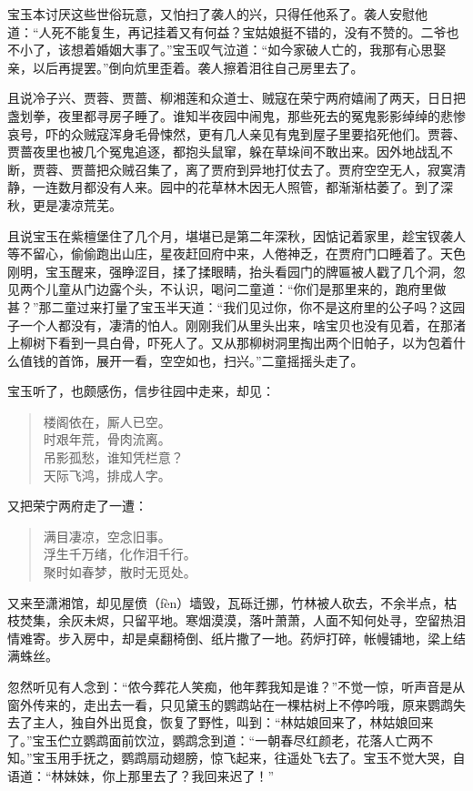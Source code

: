 \documentclass[12pt,oneside]{book}
\newenvironment{shici}{%
\begin{verse}%
\centering\large\hspace{12pt}}%
{\end{verse}}
\begin{document}
宝玉本讨厌这些世俗玩意，又怕扫了袭人的兴，只得任他系了。袭人安慰他道：“人死不能复生，再记挂着又有何益？宝姑娘挺不错的，没有不赞的。二爷也不小了，该想着婚姻大事了。”宝玉叹气泣道：“如今家破人亡的，我那有心思娶亲，以后再提罢。”倒向炕里歪着。袭人擦着泪往自己房里去了。

且说冷子兴、贾蓉、贾蔷、柳湘莲和众道士、贼寇在荣宁两府嬉闹了两天，日日把盏划拳，夜里都寻房子睡了。谁知半夜园中闹鬼，那些死去的冤鬼影影绰绰的悲惨哀号，吓的众贼寇浑身毛骨悚然，更有几人亲见有鬼到屋子里要掐死他们。贾蓉、贾蔷夜里也被几个冤鬼追逐，都抱头鼠窜，躲在草垛间不敢出来。因外地战乱不断，贾蓉、贾蔷把众贼召集了，离了贾府到异地打仗去了。贾府空空无人，寂寞清静，一连数月都没有人来。园中的花草林木因无人照管，都渐渐枯萎了。到了深秋，更是凄凉荒芜。

且说宝玉在紫檀堡住了几个月，堪堪已是第二年深秋，因惦记着家里，趁宝钗袭人等不留心，偷偷跑出山庄，星夜赶回府中来，人倦神乏，在贾府门口睡着了。天色刚明，宝玉醒来，强睁涩目，揉了揉眼睛，抬头看园门的牌匾被人戳了几个洞，忽见两个儿童从门边露个头，不认识，喝问二童道：“你们是那里来的，跑府里做甚？”那二童过来打量了宝玉半天道：“我们见过你，你不是这府里的公子吗？这园子一个人都没有，凄清的怕人。刚刚我们从里头出来，啥宝贝也没有见着，在那渚上柳树下看到一具白骨，吓死人了。又从那柳树洞里掏出两个旧帕子，以为包着什么值钱的首饰，展开一看，空空如也，扫兴。”二童摇摇头走了。

宝玉听了，也颇感伤，信步往园中走来，却见：

\begin{shici}
楼阁依在，厮人已空。\\
时艰年荒，骨肉流离。\\
吊影孤愁，谁知凭栏意？\\
天际飞鸿，排成人字。
\end{shici}


又把荣宁两府走了一遭：


\begin{shici}
满目凄凉，空念旧事。\\
浮生千万绪，化作泪千行。\\
聚时如春梦，散时无觅处。
\end{shici}

又来至潇湘馆，却见屋偾（fèn）墙毁，瓦砾迁挪，竹林被人砍去，不余半点，枯枝焚集，余灰未烬，只留平地。寒烟漠漠，落叶萧萧，人面不知何处寻，空留热泪情难寄。步入房中，却是桌翻椅倒、纸片撒了一地。药炉打碎，帐幔铺地，梁上结满蛛丝。

忽然听见有人念到：“侬今葬花人笑痴，他年葬我知是谁？”不觉一惊，听声音是从窗外传来的，走出去一看，只见黛玉的鹦鹉站在一棵枯树上不停吟哦，原来鹦鹉失去了主人，独自外出觅食，恢复了野性，叫到：“林姑娘回来了，林姑娘回来了。”宝玉伫立鹦鹉面前饮泣，鹦鹉念到道：“一朝春尽红颜老，花落人亡两不知。”宝玉用手抚之，鹦鹉扇动翅膀，惊飞起来，往遥处飞去了。宝玉不觉大哭，自语道：“林妹妹，你上那里去了？我回来迟了！”
\end{document}
